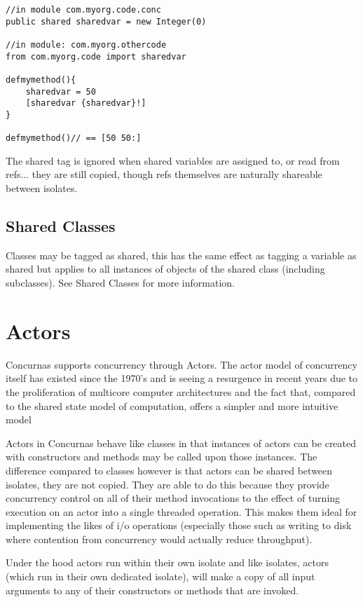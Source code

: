\documentclass[conc-doc]{subfiles}
\begin{document}
\begin{lstlisting}
//in module com.myorg.code.conc
public shared sharedvar = new Integer(0)

//in module: com.myorg.othercode
from com.myorg.code import sharedvar

defmymethod(){
	sharedvar = 50
	[sharedvar {sharedvar}!]
}

defmymethod()// == [50 50:]
\end{lstlisting}

The shared tag is ignored when shared variables are assigned to, or read from refs... they are still copied, though refs themselves are naturally shareable between isolates.

\subsection{Shared Classes}
Classes may be tagged as shared, this has the same effect as tagging a variable as shared but applies to all instances of objects of the shared class (including subclasses). See Shared Classes for more information.

\section{Actors}
\label{sec:actors}
Concurnas supports concurrency through Actors. The actor model of concurrency itself has existed since the 1970's and is seeing a resurgence in recent years due to the proliferation of multicore computer architectures and the fact that, compared to the shared state model of computation, offers a simpler and more intuitive model

Actors in Concurnas behave like classes in that instances of actors can be created with constructors and methods may be called upon those instances. The difference compared to classes however is that actors can be shared between isolates, they are not copied. They are able to do this because they provide concurrency control on all of their method invocations to the effect of turning execution on an actor into a single threaded operation. This makes them ideal for implementing the likes of i/o operations (especially those such as writing to disk where contention from concurrency would actually reduce throughput).

Under the hood actors run within their own isolate and like isolates, actors (which run in their own dedicated isolate), will make a copy of all input arguments to any of their constructors or methods that are invoked. 
\end{document}
